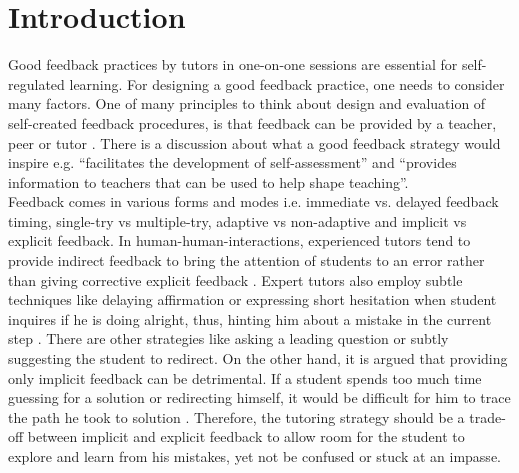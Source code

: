 \chapter{Introduction}
\label{chap:intro}
Good feedback practices by tutors in one-on-one sessions are essential for self-regulated learning. For designing a good feedback practice, one needs to consider many factors. One of many principles to think about design and evaluation of self-created feedback procedures, is that feedback can be provided by a teacher, peer or tutor \parencite{nicol2006formative}. There is a discussion about what a good feedback strategy would inspire e.g. “facilitates the development of self-assessment” and “provides information to teachers that can be used to help shape teaching”. \\
Feedback comes in various forms and modes \parencite{narciss2008feedback} i.e. immediate vs. delayed feedback timing, single-try vs multiple-try, adaptive vs non-adaptive and implicit vs explicit feedback. In human-human-interactions, experienced tutors tend to provide indirect feedback to bring the attention of students to an error rather than giving corrective explicit feedback \parencite{lepper1990self}. Expert tutors also employ subtle techniques like delaying affirmation or expressing short hesitation when student inquires if he is doing alright, thus, hinting him about a mistake in the current step \parencite{fox1991cognitive}. There are other strategies like asking a leading question or subtly suggesting the student to redirect. On the other hand, it is argued that providing only implicit feedback can be detrimental. If a student spends too much time guessing for a solution or redirecting himself, it would be difficult for him to trace the path he took to solution \parencite{lewis1985discrimination}. Therefore, the tutoring strategy should be a trade-off between implicit and explicit feedback to allow room for the student to explore and learn from his mistakes, yet not be confused or stuck at an impasse.\\
